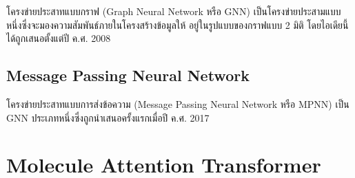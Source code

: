 โครงข่ายประสาทแบบกราฟ (Graph Neural Network หรือ GNN) เป็นโครงข่ายประสามแบบหนึ่งซึ่งจะมองความสัมพันธ์ภายในโครงสร้างข้อมูลให้%
อยู่ในรูปแบบของกราฟแบบ 2 มิติ โดยไอเดียนี้ได้ถูกเสนอตั้งแต่ปี ค.ศ. 2008\autocite{scarselli2009,zhou2020}

\subsection{Message Passing Neural Network}

โครงข่ายประสาทแบบการส่งข้อความ (Message Passing Neural Network หรือ MPNN) เป็น GNN ประเภทหนึ่งซึ่งถูกนำเสนอครั้งแรกเมื่อปี 
ค.ศ. 2017\autocite{gilmer2017}

\section{Molecule Attention Transformer}
